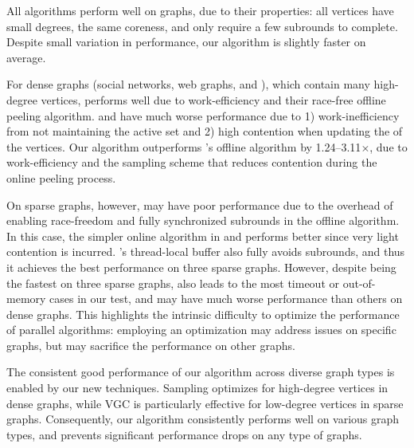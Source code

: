All algorithms perform well on \knn{} graphs, due to their properties: all vertices have small degrees, 
the same coreness, and only require a few subrounds to complete.
Despite small variation in performance, our algorithm is slightly faster on average.

For dense graphs (social networks, web graphs, \HCNS{} and \HPL{}),
which contain many high-degree vertices,
\Julienne{} performs well due to work-efficiency and their race-free offline peeling algorithm. 
\PKC{} and \Park{} have much worse performance
due to 1) work-inefficiency from not maintaining the active set and 2) high contention when updating the  of the vertices.  
Our algorithm outperforms \Julienne{}'s offline algorithm by 1.24--3.11$\times$, due to work-efficiency and the sampling scheme that reduces contention during the online peeling process. 

On sparse graphs, however, \Julienne{} may have poor performance due to the overhead of enabling race-freedom and fully synchronized subrounds in the offline algorithm. 
In this case, the simpler online algorithm in \PKC{} and \Park{} performs better since very light contention is incurred. 
\PKC{}'s thread-local buffer also fully avoids subrounds, and thus it achieves the best performance on three sparse graphs. 
However, despite being the fastest on three sparse graphs, \PKC{} also leads to the most timeout or out-of-memory cases in our test, and may have much worse performance than others on dense graphs.  
This highlights the intrinsic difficulty to optimize the performance of parallel \kcore{} algorithms: 
employing an optimization may address issues on specific graphs, but may sacrifice the performance on other graphs. 

The consistent good performance of our algorithm across diverse graph types is enabled by our new techniques. 
Sampling optimizes for high-degree vertices in dense graphs, 
while VGC is particularly effective for low-degree vertices in sparse graphs.
Consequently, our algorithm consistently performs well on various graph types, 
and prevents significant performance drops on any type of graphs.





